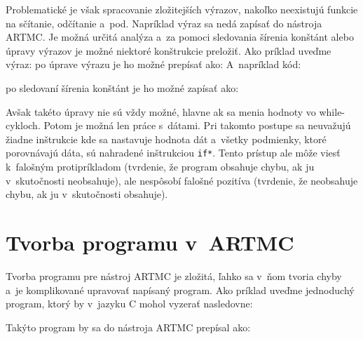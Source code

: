 Problematické je však spracovanie zložitejších výrazov, nakoľko neexistujú funkcie na sčítanie, odčítanie a~pod. Napríklad výraz
sa nedá zapísať do nástroja ARTMC. Je možná určitá analýza a~za pomoci sledovania šírenia konštánt alebo úpravy výrazov je možné niektoré konštrukcie preložiť.
\newpage
\noindent
Ako príklad uveďme výraz:  po úprave výrazu je ho možné prepísať ako: 
A~napríklad kód:


\noindent
po sledovaní šírenia konštánt je ho možné zapísať ako:


Avšak takéto úpravy nie sú vždy možné, hlavne ak sa menia hodnoty vo while-cykloch. Potom je možná len  práce s~dátami. Pri takomto postupe sa neuvažujú žiadne inštrukcie kde sa nastavuje hodnota dát a~všetky podmienky, ktoré porovnávajú dáta, sú nahradené inštrukciou \texttt{if*}. Tento prístup ale môže viesť k~falošným protipríkladom (tvrdenie, že program obsahuje chybu, ak ju v~skutočnosti neobsahuje), ale nespôsobí falošné pozitíva (tvrdenie, že neobsahuje chybu, ak ju v~skutočnosti obsahuje).

\section{Tvorba programu v~ARTMC}
Tvorba programu pre nástroj ARTMC je zložitá, ľahko sa v~ňom tvoria chyby a~je komplikované
upravovať napísaný program.
Ako príklad uveďme jednoduchý program, ktorý by v~jazyku C mohol vyzerať nasledovne:


\noindent
Takýto program by sa do nástroja ARTMC prepísal ako:


